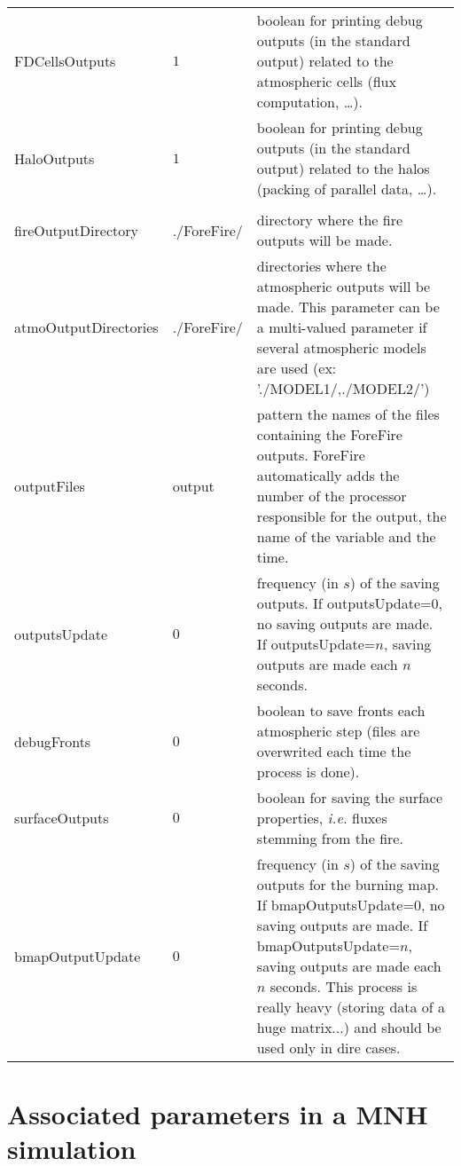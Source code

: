 \begin{center}
\begin{longtable}{|p{}|p{}|p{}|}
FDCellsOutputs & $1$ & boolean for printing debug outputs (in the standard output) related to the atmospheric cells (flux computation, \ldots). \\
HaloOutputs & $1$ & boolean for printing debug outputs (in the standard output) related to the halos (packing of parallel data, \ldots). \\ \hline
 & & \\
fireOutputDirectory & ./ForeFire/ & directory where the fire outputs will be made. \\
atmoOutputDirectories & ./ForeFire/ & directories where the atmospheric outputs will be made. This parameter can be a multi-valued parameter if several atmospheric models are used (ex: './MODEL1/,./MODEL2/') \\
outputFiles & output & pattern the names of the files containing the ForeFire outputs. ForeFire automatically adds the number of the processor responsible for the output, the name of the variable and the time. \\
outputsUpdate & $0$ & frequency (in $s$) of the saving outputs. If outputsUpdate=$0$, no saving outputs are made. If outputsUpdate=$n$, saving outputs are made each $n$ seconds. \\
debugFronts & $0$ & boolean to save fronts each atmospheric step (files are overwrited each time the process is done). \\
surfaceOutputs & $0$ & boolean for saving the surface properties, \textit{i.e.} fluxes stemming from the fire. \\
bmapOutputUpdate & $0$ & frequency (in $s$) of the saving outputs for the burning map. If bmapOutputsUpdate=$0$, no saving outputs are made. If bmapOutputsUpdate=$n$, saving outputs are made each $n$ seconds. This process is really heavy (storing data of a huge matrix...) and should be used only in dire cases. \\
\end{longtable}
\end{center}

\chapter{Associated parameters in a MNH simulation}

